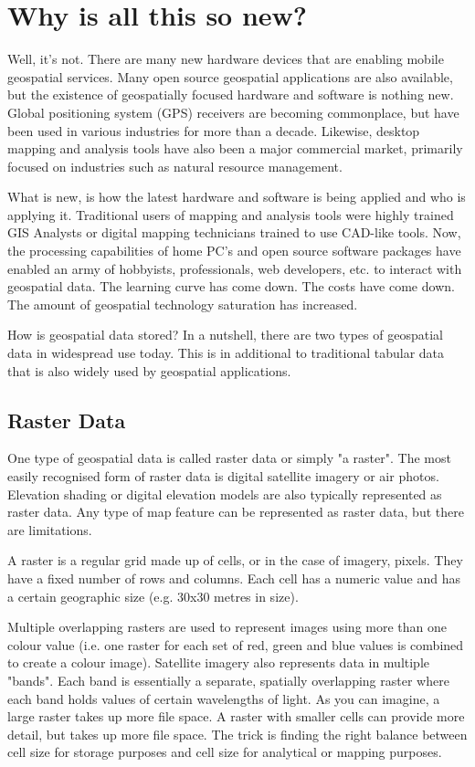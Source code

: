 \section{Why is all this so new?}
Well, it's not. There are many new hardware devices that are enabling mobile
geospatial services. Many open source geospatial applications are also
available, but the existence of geospatially focused hardware and software is
nothing new. Global positioning system (GPS) receivers are becoming
commonplace, but have been used in various industries for more than a decade.
Likewise, desktop mapping and analysis tools have also been a major commercial
market, primarily focused on industries such as natural resource management.

What is new, is how the latest hardware and software is being applied and who
is applying it. Traditional users of mapping and analysis tools were highly
trained GIS Analysts or digital mapping technicians trained to use CAD-like
tools. Now, the processing capabilities of home PC's and open source software
packages have enabled an army of hobbyists, professionals, web developers,
etc. to interact with geospatial data. The learning curve has come down. The
costs have come down. The amount of geospatial technology saturation has
increased.

How is geospatial data stored?
In a nutshell, there are two types of geospatial data in widespread use today.
This is in additional to traditional tabular data that is also widely used by
geospatial applications.

\subsection{Raster Data}
One type of geospatial data is called raster data or simply "a raster". The
most easily recognised form of raster data is digital satellite imagery or air
photos. Elevation shading or digital elevation models are also typically
represented as raster data. Any type of map feature can be represented as
raster data, but there are limitations.

A raster is a regular grid made up of cells, or in the case of imagery,
pixels. They have a fixed number of rows and columns. Each cell has a numeric
value and has a certain geographic size (e.g. 30x30 metres in size).

Multiple overlapping rasters are used to represent images using more than one
colour value (i.e. one raster for each set of red, green and blue values is
combined to create a colour image). Satellite imagery also represents data in
multiple "bands". Each band is essentially a separate, spatially overlapping
raster where each band holds values of certain wavelengths of light. As you
can imagine, a large raster takes up more file space. A raster with smaller
cells can provide more detail, but takes up more file space. The trick is
finding the right balance between cell size for storage purposes and cell size
for analytical or mapping purposes.

